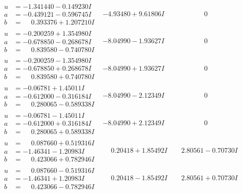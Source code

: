 \documentclass[1p]{elsarticle_modified}
\theoremstyle{definition}
\begin{document}
$$\begin{array}{c|c|c}
\begin{aligned}
u &= -1.341440 - 0.149230 I \\
a &= -0.439121 - 0.596745 I \\
b &= \phantom{-}0.393376 + 1.207210 I\end{aligned}
 & -4.93480 + 9.61806 I & \phantom{-0.000000 } 0 \\ \hline\begin{aligned}
u &= -0.200259 + 1.354980 I \\
a &= -0.678850 - 0.268678 I \\
b &= \phantom{-}0.839580 - 0.740780 I\end{aligned}
 & -8.04990 - 1.93627 I & \phantom{-0.000000 } 0 \\ \hline\begin{aligned}
u &= -0.200259 - 1.354980 I \\
a &= -0.678850 + 0.268678 I \\
b &= \phantom{-}0.839580 + 0.740780 I\end{aligned}
 & -8.04990 + 1.93627 I & \phantom{-0.000000 } 0 \\ \hline\begin{aligned}
u &= -0.06781 + 1.45011 I \\
a &= -0.612000 - 0.316184 I \\
b &= \phantom{-}0.280065 - 0.589338 I\end{aligned}
 & -8.04990 - 2.12349 I & \phantom{-0.000000 } 0 \\ \hline\begin{aligned}
u &= -0.06781 - 1.45011 I \\
a &= -0.612000 + 0.316184 I \\
b &= \phantom{-}0.280065 + 0.589338 I\end{aligned}
 & -8.04990 + 2.12349 I & \phantom{-0.000000 } 0 \\ \hline\begin{aligned}
u &= \phantom{-}0.087660 + 0.519316 I \\
a &= -1.46341 - 1.20983 I \\
b &= \phantom{-}0.423066 + 0.782946 I\end{aligned}
 & \phantom{-}0.20418 + 1.85492 I & \phantom{-}2.80561 - 0.70730 I \\ \hline\begin{aligned}
u &= \phantom{-}0.087660 - 0.519316 I \\
a &= -1.46341 + 1.20983 I \\
b &= \phantom{-}0.423066 - 0.782946 I\end{aligned}
 & \phantom{-}0.20418 - 1.85492 I & \phantom{-}2.80561 + 0.70730 I \\ \hline\begin{aligned}

\end{aligned}
\end{array}$$
\end{document}
